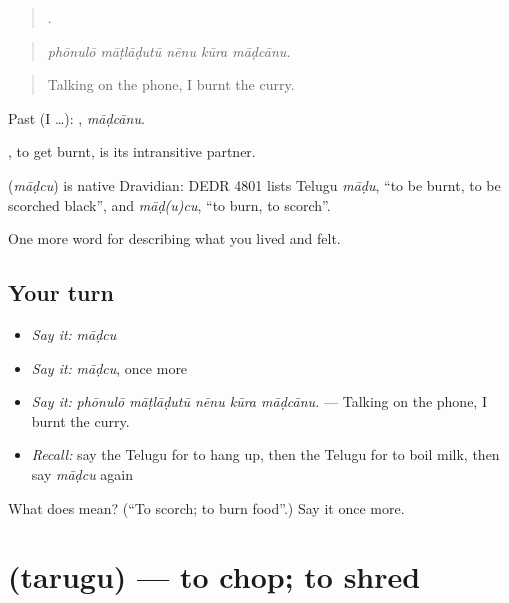 \begin{quote}
    .
\end{quote}

\begin{quote}
\emph{phōnulō māṭlāḍutū nēnu kūra māḍcānu.}
\end{quote}

\begin{quote}
Talking on the phone, I burnt the curry.
\end{quote}

Past (I …): , \emph{māḍcānu}.

, to get burnt, is its intransitive partner.

\begin{cousinweb}
\textbf{} (\emph{māḍcu}) is native Dravidian: DEDR 4801 lists Telugu \emph{māḍu}, \textquotedblleft{}to be burnt, to be scorched black\textquotedblright{}, and \emph{māḍ(u)cu}, \textquotedblleft{}to burn, to scorch\textquotedblright{}.
\end{cousinweb}

\begin{grammarlens}[title={What you've built}]
One more word for describing what you lived and felt.
\end{grammarlens}

\subsection*{Your turn}
\begin{itemize}
\raggedright
  \item \emph{Say it:} \emph{māḍcu}
  \item \emph{Say it:} \emph{māḍcu}, once more
  \item \emph{Say it:} \emph{phōnulō māṭlāḍutū nēnu kūra māḍcānu.} — Talking on the phone, I burnt the curry.
  \item \emph{Recall:} say the Telugu for to hang up, then the Telugu for to boil milk, then say \emph{māḍcu} again
\end{itemize}

\begin{tcolorbox}[breakable,colback=teal!4,colframe=teal!35!black,title={Before you move on}]
What does  mean? (\textquotedblleft{}To scorch; to burn food\textquotedblright{}.) Say it once more.
\end{tcolorbox}
\section[\texorpdfstring{\te{తరుగు} (tarugu)}{తరుగు (tarugu)}]{ (tarugu) — to chop; to shred}

